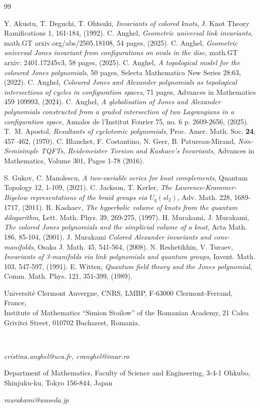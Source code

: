 \documentclass[reqno,a4paper,11pt]{amsart}
\numberwithin{equation}{section}
\numberwithin{figure}{section}
\theoremstyle{definition}
\theoremstyle{plain}
\begin{document}
\begin{thebibliography}{99}

 Y. Akustu, T. Deguchi, T. Ohtsuki,  {\em Invariants of colored knots}, J. Knot Theory Ramifications 1, 161-184, (1992).
 C. Anghel,   {\em Geometric universal link invariants}, math.GT arxiv.org/abs/2505.18108, 54 pages, (2025).
 C. Anghel,  {\em Geometric universal Jones invariant from configurations on ovals in the disc}, math.GT arxiv: 2401.17245v3, 58 pages, (2025).
 C. Anghel,  {\em A topological model for the coloured Jones polynomials}, 50 pages, {Selecta Mathematica New Series} 28:63, (2022).
 C. Anghel, { \em Coloured Jones and Alexander polynomials as topological intersections of cycles in configuration spaces}, 71 pages,
{Advances in Mathematics} 459 109993, (2024).
 C. Anghel, {\em A globalisation of Jones and Alexander polynomials constructed from a graded intersection of two Lagrangians in a configuration space}, Annales de l’Institut Fourier 75, no. 6 p. 2609-2656, (2025).
 T.~M. Apostol,  {\em Resultants of cyclotomic polynomials}, Proc. Amer. Math. Soc. {\bf 24},  457--462, (1970).
 C. Blanchet, F. Costantino, N. Geer,
  B. Patureau-Mirand,  {\em Non-Semisimple TQFTs, Reidemeister
    Torsion and Kashaev's Invariants}, Advances in Mathematics,
  Volume 301, Pages 1-78 (2016).

 S. Gukov, C. Manolescu, {\em A two-variable series for knot complements}, Quantum Topology 12, 1-109, (2021).
 C. Jackson, T. Kerler, {\em The Lawrence-Krammer-Bigelow representations of the braid groups via $U_q(sl_2)$}, Adv. Math. 228, 1689-1717, (2011).
 R. Kashaev, {\em The hyperbolic volume of knots from the quantum dilogarithm}, Lett. Math. Phys. 39, 269-275, (1997).
 H. Murakami, J. Murakami, {\em The colored Jones polynomials and the simplicial volume of a knot}, Acta Math. 186, 85-104, (2001).
 J. Murakami  {\em Colored Alexander invariants and cone-manifolds}, Osaka J. Math. 45, 541-564, (2008).
 N. Reshetikhin, V. Turaev, {\em Invariants of 3-manifolds via link polynomials and quantum groups}, Invent. Math. 103, 547-597, (1991).
E. Witten, {\em Quantum field theory and the Jones polynomial}, Comm. Math. Phys. 121, 351-399, (1989).


\end{thebibliography}


 {
 
Universit\'e Clermont Auvergne, CNRS, LMBP, F-63000 Clermont-Ferrand, France, \\Institute of Mathematics “Simion Stoilow” of the Romanian Academy, 21 Calea Grivitei Street, 010702 Bucharest, Romania.}
\

{\itshape cristina.anghel@uca.fr, cranghel@imar.ro}
\par
{
Department of Mathematics, Faculty of Science and Engineering, 3-4-1 Ohkubo, Shinjuku-ku, Tokyo 156-844, Japan
}
\par
{\itshape murakami@waseda.jp}
\end{document}

